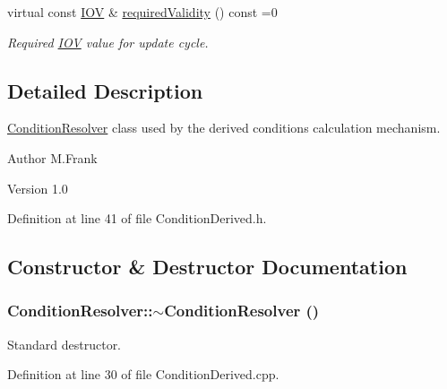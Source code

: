 \begin{DoxyCompactItemize}
virtual const \hyperlink{class_d_d4hep_1_1_i_o_v}{IOV} \& \hyperlink{class_d_d4hep_1_1_conditions_1_1_condition_resolver_a96b82698fa08d7b1ecb46cd36f5e543f}{requiredValidity} () const =0
\begin{DoxyCompactList}\small\item\em Required \hyperlink{class_d_d4hep_1_1_i_o_v}{IOV} value for update cycle. \item\end{DoxyCompactList}\end{DoxyCompactItemize}


\subsection{Detailed Description}
\hyperlink{class_d_d4hep_1_1_conditions_1_1_condition_resolver}{ConditionResolver} class used by the derived conditions calculation mechanism. \begin{DoxyAuthor}{Author}
M.Frank 
\end{DoxyAuthor}
\begin{DoxyVersion}{Version}
1.0 
\end{DoxyVersion}


Definition at line 41 of file ConditionDerived.h.

\subsection{Constructor \& Destructor Documentation}
\hypertarget{class_d_d4hep_1_1_conditions_1_1_condition_resolver_abb26bddb3600ca97c9b40cc3a3ad1d40}{
\subsubsection[{$\sim$ConditionResolver}]{\setlength{\rightskip}{0pt plus 5cm}ConditionResolver::$\sim$ConditionResolver ()}}
\label{class_d_d4hep_1_1_conditions_1_1_condition_resolver_abb26bddb3600ca97c9b40cc3a3ad1d40}


Standard destructor. 

Definition at line 30 of file ConditionDerived.cpp.

